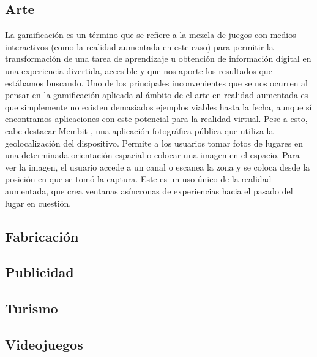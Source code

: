 \subsection{Arte}
La gamificación es un término que se refiere a la mezcla de juegos con medios interactivos (como la realidad aumentada en este caso) para permitir la transformación de una tarea de aprendizaje u obtención de información digital en una experiencia divertida, accesible y que nos aporte los resultados que estábamos buscando.
Uno de los principales inconvenientes que se nos ocurren al pensar en la gamificación aplicada al ámbito de el arte en realidad aumentada es que simplemente no existen demasiados ejemplos viables hasta la fecha, aunque sí encontramos aplicaciones con este potencial para la realidad virtual.
Pese a esto, cabe destacar Membit \cite{MembitYT}, una aplicación fotográfica pública que utiliza la geolocalización del dispositivo. Permite a los usuarios tomar fotos de lugares en una determinada orientación espacial o colocar una imagen en el espacio. Para ver la imagen, el usuario accede a un canal o escanea la zona y se coloca desde la posición en que se tomó la captura. Este es un uso único de la realidad aumentada, que crea ventanas asíncronas de experiencias hacia el pasado del lugar en cuestión. 
\cite{ARGames_Gamification}
\subsection{Fabricación}
\subsection{Publicidad}
\subsection{Turismo}
\subsection{Videojuegos}
